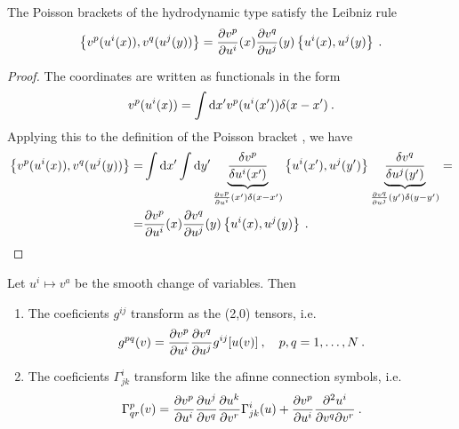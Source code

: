 \begin{proposition}
    The Poisson brackets of the hydrodynamic type satisfy the Leibniz rule
    \begin{align}
        \label{eq:transformace-zavorka}
        \left \lbrace v^p(u^i(x)),v^q(u^j(y)) \right \rbrace = \frac{\partial v^p}{\partial u^i}(x) \frac{\partial v^q}{\partial u^j}(y) \left \lbrace u^i(x),u^j(y) \right \rbrace \:. 
    \end{align}
\end{proposition}
\begin{proof}
    The coordinates are written as functionals in the form
    \begin{align}
        v^p(u^i(x)) = \int \mathrm{d} x' v^p(u^i(x')) \delta (x-x') \:.
    \end{align}
    Applying this to the definition of the Poisson bracket \label{eq:Poisson1D}, we have
    \begin{align}
        \left \lbrace v^p(u^i(x)),v^q(u^j(y)) \right \rbrace 
        =& \int \mathrm{d} x' \int \mathrm{d} y' \underbrace{\frac{\delta v^p}{\delta u^i(x')} }_{\frac{\partial v^p}{\partial u^i}(x') \delta(x-x')} \left \lbrace u^i(x'),u^j(y') \right \rbrace \underbrace{\frac{\delta v^q}{\delta u^j(y')} }_{\frac{\partial v^q}{\partial u^j}(y') \delta(y-y')}
        = \\ =& \frac{\partial v^p}{\partial u^i}(x) \frac{\partial v^q}{\partial u^j}(y) \left \lbrace u^i(x),u^j(y) \right \rbrace \:.
    \end{align}
\end{proof}


\begin{proposition} \label{prop:transoformace}
    Let $u^i \mapsto v^a$ be the smooth change of variables. Then
    \begin{enumerate}
        \item The coeficients $g^{ij}$ transform as the (2,0) tensors, i.e. 
        \begin{align}
            g^{pq}(v) = \frac{\partial v^p}{\partial u^i} \frac{\partial v^q}{\partial u^j} g^{ij}[u(v)] \:, \quad p, q = 1, \dots, N \:. \label{eq:transformace-metrika}
        \end{align}
        \item The coeficients $\Gamma^i_{jk}$ transform like the afinne connection symbols, i.e.
        \begin{align}
            \Gamma^p_{qr} (v) = \frac{\partial v^p}{\partial u^i} \frac{\partial u^j}{\partial v^q} \frac{\partial u^k}{\partial v^r} \Gamma^i_{jk}(u) + \frac{\partial v^p}{\partial u^i} \frac{\partial^2 u^i}{\partial v^q \partial v^r} \:. \label{eq:transformace-konexe}
        \end{align}
    \end{enumerate}
\end{proposition}

